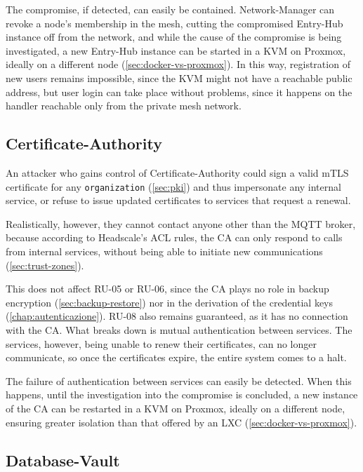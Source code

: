 The compromise, if detected, can easily be contained. Network-Manager can revoke
a node's membership in the mesh, cutting the compromised Entry-Hub instance off from the network, and while
the cause of the compromise is being investigated, a new Entry-Hub instance can be started in a KVM on
Proxmox, ideally on a different node (\autoref{sec:docker-vs-proxmox}). In this way, registration of new users remains impossible, since the KVM might
not have a reachable public address, but user login can take place without problems,
since it happens on the handler reachable only from the private mesh network.


\subsection{Certificate-Authority}

An attacker who gains control of Certificate-Authority could sign a valid mTLS certificate
for any \texttt{organization} (\autoref{sec:pki}) and thus impersonate any internal
service, or refuse to issue updated certificates to services that request a renewal.

Realistically, however, they cannot contact anyone other than the MQTT broker, because according to Headscale's ACL rules, the CA can only
respond to calls from internal services, without being able to initiate new communications (\autoref{sec:trust-zones}).

This does not affect RU-05 or RU-06, since the CA plays no role in backup encryption
(\autoref{sec:backup-restore}) nor in the derivation of the credential keys
(\autoref{chap:autenticazione}).
RU-08 also remains guaranteed, as it has no connection with the CA.
What breaks down is mutual authentication between services.
The services, however, being unable to renew their certificates, can no longer communicate, so
once the certificates expire, the entire system comes to a halt.

The failure of authentication between services can easily be detected.
When this happens, until the investigation into the compromise is concluded, a new instance of the
CA can be restarted in a KVM on Proxmox, ideally on
a different node, ensuring greater isolation than that offered by an LXC (\autoref{sec:docker-vs-proxmox}).


\subsection{Database-Vault}

